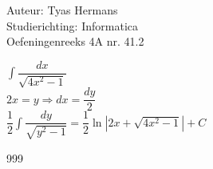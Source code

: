 \documentclass[a4paper]{article}
\newcommand{\dint}{\displaystyle\int}
\begin{document}
  
\noindent \large Auteur: Tyas Hermans \\
\noindent \large Studierichting: Informatica\\
\noindent \large Oefeningenreeks 4A nr. 41.2\\

\medskip

\normalsize

$\dint\dfrac{dx}{\sqrt{4x^2-1}}$\\

$2x = y\Rightarrow dx=\dfrac{dy}{2}$\\

$\dfrac{1}{2}\dint\dfrac{dy}{\sqrt{y^2-1}} = \dfrac{1}{2}\ln|2x+\sqrt{4x^2-1}|+C$\\

\begin{thebibliography}{999}
\end{thebibliography}
\end{document}
